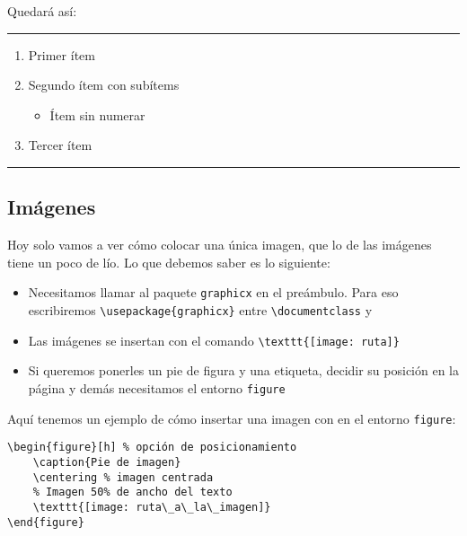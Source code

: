 Quedará así:

\begin{center}\rule{0.5\linewidth}{\@wholewidth}\end{center}

\begin{enumerate}
\item
  Primer ítem
\item
  Segundo ítem con subítems

  \begin{itemize}
  \item
    Ítem sin numerar
  \end{itemize}
\item
  Tercer ítem
\end{enumerate}

\begin{center}\rule{0.5\linewidth}{\@wholewidth}\end{center}

\subsection{Imágenes}\label{imuxe1genes}

Hoy solo vamos a ver cómo colocar una única imagen, que lo de las
imágenes tiene un poco de lío. Lo que debemos saber es lo siguiente:

\begin{itemize}
\item
  Necesitamos llamar al paquete \lstinline!graphicx! en el preámbulo.
  Para eso escribiremos \lstinline!\usepackage{graphicx}! entre
  \lstinline!\documentclass! y \lstinline!!
\item
  Las imágenes se insertan con el comando
  \lstinline!\texttt{[image: ruta]}!
\item
  Si queremos ponerles un pie de figura y una etiqueta, decidir su
  posición en la página y demás necesitamos el entorno
  \lstinline!figure!
\end{itemize}

Aquí tenemos un ejemplo de cómo insertar una imagen con en el entorno
\lstinline!figure!:

\begin{lstlisting}[language={[latex]tex}]
\begin{figure}[h] % opción de posicionamiento
    \caption{Pie de imagen}
    \centering % imagen centrada
    % Imagen 50% de ancho del texto
    \texttt{[image: ruta\_a\_la\_imagen]}
\end{figure}
\end{lstlisting}

